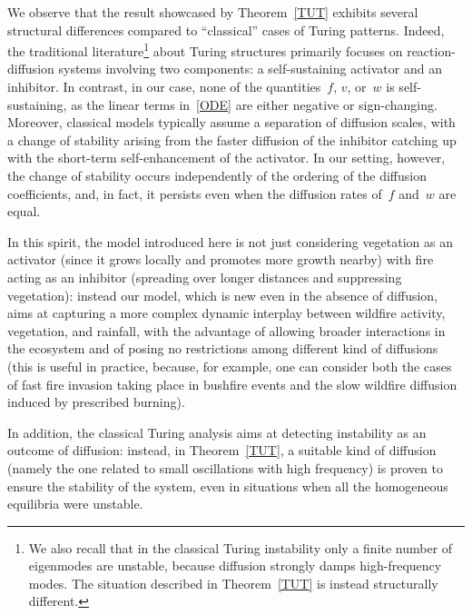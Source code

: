 \documentclass[12pt]{amsart}
\numberwithin{equation}{section}
\begin{document}
We observe that the result showcased by Theorem~\ref{TUT} exhibits several structural differences compared to ``classical'' cases of Turing patterns. Indeed, the traditional literature\footnote{We also recall that
in the classical Turing instability only a finite number
of eigenmodes are unstable, because diffusion strongly damps high-frequency modes.
The situation described in Theorem~\ref{TUT} is instead structurally different.}
about Turing structures primarily focuses on reaction-diffusion systems involving two components: a self-sustaining activator and an inhibitor. In contrast, in our case, none of the quantities~$f$, $v$, or~$w$ is self-sustaining, as the linear terms in~\eqref{ODE} are either negative or sign-changing. Moreover, classical models typically assume a separation of diffusion scales, with a change of stability arising from the faster diffusion of the inhibitor catching up with the short-term self-enhancement of the activator. In our setting, however, the change of stability occurs independently of the ordering of the diffusion coefficients, and, in fact, it persists even when the diffusion rates of~$f$ and~$w$ are equal.

In this spirit, the model introduced here
is not just considering vegetation as an activator (since it grows locally and promotes more growth nearby)
with fire acting as an inhibitor (spreading over longer distances and suppressing vegetation): instead our model,
which is new even in the absence of diffusion, aims at capturing a more complex dynamic interplay
between wildfire activity, vegetation, and rainfall, with the advantage of allowing broader interactions
in the ecosystem and of posing no restrictions among different kind of diffusions (this is useful in practice,
because, for example, one can consider both the cases of fast
fire invasion taking place in bushfire events and
the slow wildfire diffusion induced by prescribed burning).

In addition, the classical Turing analysis aims at detecting
instability as an outcome of diffusion: instead,
in Theorem~\ref{TUT}, a suitable kind of diffusion
(namely the one related to small oscillations with high frequency)
is proven to ensure the stability of the system, even in situations
when all the homogeneous equilibria were unstable. 
\end{document}
